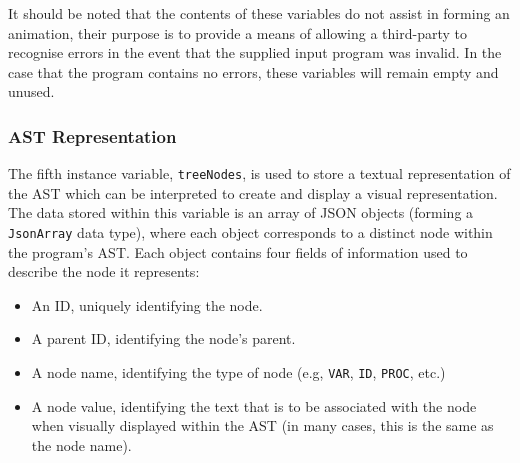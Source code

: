 \documentclass{l4proj}
\begin{document}
It should be noted that the contents of these variables do not assist in forming an animation, their purpose is to provide a means of allowing a third-party to recognise errors in the event that the supplied input program was invalid. In the case that the program contains no errors, these variables will remain empty and unused.

\subsubsection{AST Representation}
The fifth instance variable, \texttt{treeNodes}, is used to store a textual representation of the AST which can be interpreted to create and display a visual representation. The data stored within this variable is an array of JSON objects (forming a \texttt{JsonArray} data type), where each object corresponds to a distinct node within the program's AST. Each object contains four fields of information used to describe the node it represents:
\begin{itemize}
\item An ID, uniquely identifying the node.
\item A parent ID, identifying the node's parent.
\item A node name, identifying the type of node (e.g, \texttt{VAR}, \texttt{ID}, \texttt{PROC}, etc.)
\item A node value, identifying the text that is to be associated with the node when visually displayed within the AST (in many cases, this is the same as the node name).
\end{itemize}
\end{document}
